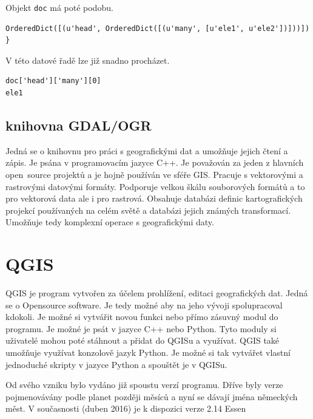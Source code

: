 Objekt {\tt doc} má poté podobu.

{\scriptsize
\lstset{language=Python}
\begin{lstlisting}
OrderedDict([(u'head', OrderedDict([(u'many', [u'ele1', u'ele2'])]))]) }
\end{lstlisting}
}

V této datové řadě lze již snadno procházet. 

{\scriptsize
\lstset{language=Python}
\begin{lstlisting}
doc['head']['many'][0]
ele1
\end{lstlisting}
}


\subsection{knihovna GDAL/OGR}
\label{GDAL/OGR}
Jedná se o knihovnu pro práci s geografickými dat a umožňuje jejich čtení a zápis.
Je psána v programovacím jazyce C++. Je považován za jeden z hlavních 
open~source projektů a je hojně používán ve sféře GIS. Pracuje s vektorovými a 
rastrovými datovými formáty. Podporuje velkou škálu souborových formátů a to 
pro vektorová data ale i pro rastrová. Obsahuje databázi definic kartografických
projekcí používaných na celém světě a databázi jejich známých transformací. 
Umožňuje tedy komplexní operace s geografickými daty. \cite{GDAL}


\section{QGIS}
\label{QGIS}
QGIS je program vytvořen za účelem prohlížení, editaci geografických dat.
Jedná se o Opensource software. Je tedy možné aby na jeho vývoji spolupracoval
kdokoli. Je možné si vytvářit novou funkci nebo přímo zásuvný modul do programu.
Je možné je psát v jazyce C++ nebo Python.
Tyto moduly si uživatelé mohou poté stáhnout a přidat do QGISu a využívat.
QGIS také umožňuje využívat konzolově jazyk Python. Je možné si tak vytvářet
vlastní jednoduché skripty v jazyce Python a spouštět je v QGISu.

Od svého vzniku bylo vydáno již spoustu verzí programu.
Dříve byly verze pojmenovávány podle planet později měsíců a nyní se dávají
jména německých měst. V současnosti (duben 2016) je k dispozici verze 2.14 Essen
